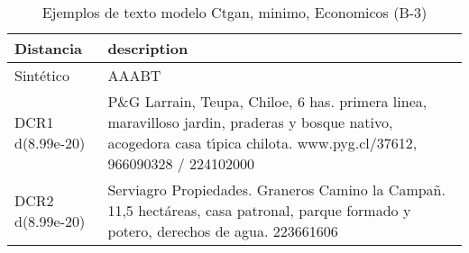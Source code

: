 \begin{table}[H]
\centering
\fontsize{10}{14}\selectfont
\caption{Ejemplos de texto modelo Ctgan, minimo, Economicos (B-3)}
\label{table-example-economicos-b-3-ctgan-min-text}
\begin{tabular}{|l|m{35em}|}
\hline
\rowcolor[gray]{0.8}
Distancia & description \\
\hline Sintético & AAABT \\
\hline DCR1 d(8.99e-20) & P\&G Larrain, Teupa, Chiloe, 6 has. primera linea, maravilloso jardin, praderas y bosque nativo, acogedora casa t{\'\i}pica chilota. www.pyg.cl/37612, 966090328 / 224102000 \\
\hline DCR2 d(8.99e-20) & Serviagro Propiedades. Graneros Camino la Campa\~n. 11,5 hect\'areas, casa patronal, parque formado y potero, derechos de agua. 223661606 \\
\hline
\end{tabular}
\end{table}
